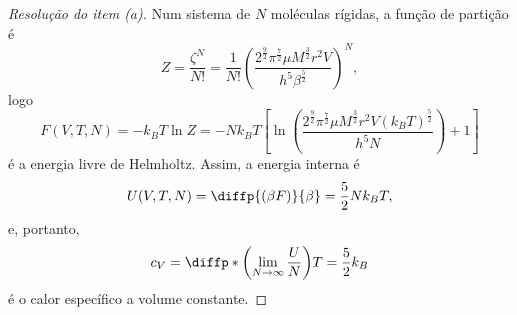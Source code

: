 \begin{proof}[Resolução do item (a)]
    Num sistema de \(N\) moléculas rígidas, a função de partição é
    \begin{equation*}
        Z = \frac{\zeta^N}{N!} = \frac{1}{N!}\left(\frac{2^{\frac92}\pi^{\frac72}\mu M^{\frac32} r^2V}{h^5\beta^{\frac52}}\right)^N,
    \end{equation*}
    logo
    \begin{equation*}
        F(V, T, N) = -k_B T \ln Z = - Nk_BT\left[\ln\left(\frac{2^{\frac92}\pi^{\frac72}\mu M^{\frac32} r^2V(k_BT)^{\frac52}}{h^5 N}\right) + 1\right]
    \end{equation*}
    é a energia livre de Helmholtz. Assim, a energia interna é
    \begin{equation*}
        U(V, T, N) = \diffp{(\beta F)}{\beta} = \frac52 N k_B T,
    \end{equation*}
    e, portanto,
    \begin{equation*}
        c_V = \diffp*{\left(\lim_{N\to \infty} \frac{U}{N}\right)}{T} = \frac52 k_B
    \end{equation*}
    é o calor específico a volume constante.
\end{proof}

